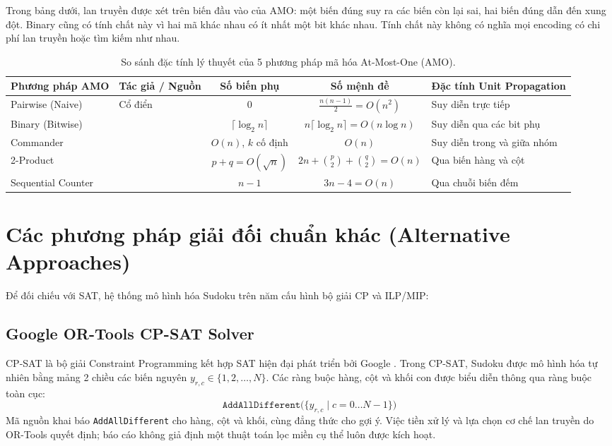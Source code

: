 \documentclass[a4paper,fleqn,nologo]{cas-sc}
\begin{document}
Trong bảng dưới, lan truyền được xét trên biến đầu vào của AMO: một biến đúng suy ra các biến còn lại sai, hai biến đúng dẫn đến xung đột. Binary cũng có tính chất này vì hai mã khác nhau có ít nhất một bit khác nhau. Tính chất này không có nghĩa mọi encoding có chi phí lan truyền hoặc tìm kiếm như nhau.

\begin{table}[pos=!htbp]
\centering
\small
\caption{So sánh đặc tính lý thuyết của 5 phương pháp mã hóa At-Most-One (AMO).}
\label{tab:amo_theory}
\setlength{\tabcolsep}{4pt}
\begin{tabular}{@{}l l c c p{3.6cm}@{}}
\toprule
\textbf{Phương pháp AMO} & \textbf{Tác giả / Nguồn} & \textbf{Số biến phụ} & \textbf{Số mệnh đề} & \textbf{Đặc tính Unit Propagation} \\
\midrule
Pairwise (Naive) & Cổ điển & $0$ & $\frac{n(n-1)}{2}=O(n^2)$ & Suy diễn trực tiếp \\
Binary (Bitwise) & \cite{frisch2005effective} & $\lceil\log_2 n\rceil$ & $n\lceil\log_2 n\rceil=O(n\log n)$ & Suy diễn qua các bit phụ \\
Commander & \cite{klieber2007efficient} & $O(n)$, $k$ cố định & $O(n)$ & Suy diễn trong và giữa nhóm \\
2-Product & \cite{chen2010new} & $p+q=O(\sqrt n)$ & $2n+\binom p2+\binom q2=O(n)$ & Qua biến hàng và cột \\
Sequential Counter & \cite{sinz2005towards} & $n-1$ & $3n-4=O(n)$ & Qua chuỗi biến đếm \\
\bottomrule
\end{tabular}
\end{table}

\section{Các phương pháp giải đối chuẩn khác (Alternative Approaches)}

Để đối chiếu với SAT, hệ thống mô hình hóa Sudoku trên năm cấu hình bộ giải CP và ILP/MIP:

\subsection{Google OR-Tools CP-SAT Solver}
CP-SAT là bộ giải Constraint Programming kết hợp SAT hiện đại phát triển bởi Google \cite{perron2024ortools}. Trong CP-SAT, Sudoku được mô hình hóa tự nhiên bằng mảng 2 chiều các biến nguyên $y_{r,c} \in \{1, 2, \dots, N\}$. Các ràng buộc hàng, cột và khối con được biểu diễn thông qua ràng buộc toàn cục:
\begin{equation}
\texttt{AddAllDifferent}\Big(\{y_{r,c} \mid c = 0 \dots N-1\}\Big)
\end{equation}
Mã nguồn khai báo \texttt{AddAllDifferent} cho hàng, cột và khối, cùng đẳng thức cho gợi ý. Việc tiền xử lý và lựa chọn cơ chế lan truyền do OR-Tools quyết định; báo cáo không giả định một thuật toán lọc miền cụ thể luôn được kích hoạt.
\end{document}

